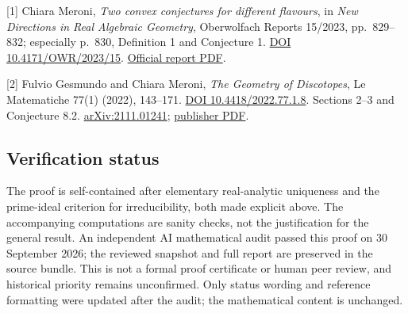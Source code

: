 \documentclass[
  11pt,
  letterpaper,
]{article}
\begin{document}
{[}1{]} Chiara Meroni, \emph{Two convex conjectures for different
flavours}, in \emph{New Directions in Real Algebraic Geometry},
Oberwolfach Reports 15/2023, pp.~829--832; especially p.~830, Definition
1 and Conjecture 1. \href{https://doi.org/10.4171/OWR/2023/15}{DOI
10.4171/OWR/2023/15}.
\href{https://publications.mfo.de/bitstream/handle/mfo/4031/OWR_2023_15.pdf?sequence=4}{Official
report PDF}.

{[}2{]} Fulvio Gesmundo and Chiara Meroni, \emph{The Geometry of
Discotopes}, Le Matematiche 77(1) (2022), 143--171.
\href{https://doi.org/10.4418/2022.77.1.8}{DOI 10.4418/2022.77.1.8}.
Sections 2--3 and Conjecture 8.2.
\href{https://arxiv.org/abs/2111.01241}{arXiv:2111.01241};
\href{https://lematematiche.dmi.unict.it/index.php/lematematiche/article/download/2338/1156/6734}{publisher
PDF}.

\subsection{Verification status}\label{verification-status}

The proof is self-contained after elementary real-analytic uniqueness
and the prime-ideal criterion for irreducibility, both made explicit
above. The accompanying computations are sanity checks, not the
justification for the general result. An independent AI mathematical
audit passed this proof on 30 September 2026; the reviewed snapshot and
full report are preserved in the source bundle. This is not a formal
proof certificate or human peer review, and historical priority remains
unconfirmed. Only status wording and reference formatting were updated
after the audit; the mathematical content is unchanged.
\end{document}
